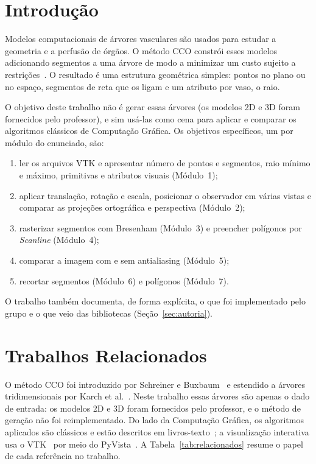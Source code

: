 \documentclass[11pt, a4paper]{article}
\begin{document}
\vspace{0.4cm}

\section{Introdução}
Modelos computacionais de árvores vasculares são usados para estudar a
geometria e a perfusão de órgãos. O método CCO constrói esses modelos
adicionando segmentos a uma árvore de modo a minimizar um custo sujeito a
restrições~\cite{schreiner1993,karch1999}. O resultado é uma estrutura
geométrica simples: pontos no plano ou no espaço, segmentos de reta que os
ligam e um atributo por vaso, o raio.

O objetivo deste trabalho não é gerar essas árvores (os modelos 2D e 3D foram
fornecidos pelo professor), e sim usá-las como cena para aplicar e comparar
os algoritmos clássicos de Computação Gráfica. Os objetivos específicos, um por
módulo do enunciado, são:
\begin{enumerate}[leftmargin=*]
  \item ler os arquivos VTK e apresentar número de pontos e segmentos, raio mínimo e
        máximo, primitivas e atributos visuais (Módulo~1);
  \item aplicar translação, rotação e escala, posicionar o observador em várias vistas e
        comparar as projeções ortográfica e perspectiva (Módulo~2);
  \item rasterizar segmentos com Bresenham (Módulo~3) e preencher polígonos por
        \emph{Scanline} (Módulo~4);
  \item comparar a imagem com e sem antialiasing (Módulo~5);
  \item recortar segmentos (Módulo~6) e polígonos (Módulo~7).
\end{enumerate}
O trabalho também documenta, de forma explícita, o que foi implementado pelo grupo
e o que veio das bibliotecas (Seção~\ref{sec:autoria}).

\section{Trabalhos Relacionados}
O método CCO foi introduzido por Schreiner e Buxbaum~\cite{schreiner1993} e estendido a árvores tridimensionais por Karch et al.~\cite{karch1999}. Neste trabalho essas árvores são apenas o dado de entrada: os modelos 2D e 3D foram fornecidos pelo professor, e o método de geração não foi reimplementado. Do lado da Computação Gráfica, os algoritmos aplicados são clássicos e estão descritos em livros-texto~\cite{foley1990}; a visualização interativa usa o VTK~\cite{vtk} por meio do PyVista~\cite{pyvista}. A Tabela~\ref{tab:relacionados} resume o papel de cada referência no trabalho.
\end{document}
